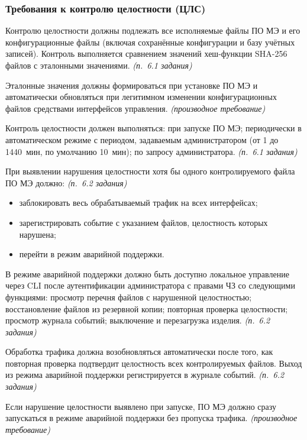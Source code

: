 \documentclass[12pt,a4paper,final]{article}
\newenvironment{reqs}
  {\begin{description}[style=sameline,leftmargin=2.2cm,labelwidth=2.0cm,
     labelsep=0.2cm,font=\normalfont\bfseries,itemsep=3pt]}
  {\end{description}}
\newcommand{\src}[1]{\textit{(п.~#1 задания)}}
\newcommand{\der}{\textit{(производное требование)}}
\begin{document}
\subsubsection{Требования к контролю целостности (ЦЛС)}

\begin{reqs}
\item[ЦЛС-01] Контролю целостности должны подлежать все исполняемые файлы
  ПО МЭ и его конфигурационные файлы (включая сохранённые конфигурации
  и базу учётных записей). Контроль выполняется сравнением значений хеш-функции
  SHA-256 файлов с эталонными значениями. \src{6.1}
\item[ЦЛС-02] Эталонные значения должны формироваться при установке ПО МЭ
  и автоматически обновляться при легитимном изменении конфигурационных файлов
  средствами интерфейсов управления. \der
\item[ЦЛС-03] Контроль целостности должен выполняться: при запуске ПО МЭ;
  периодически в автоматическом режиме с периодом, задаваемым администратором
  (от 1 до 1440~мин, по умолчанию 10~мин); по запросу администратора. \src{6.1}
\item[ЦЛС-04] При выявлении нарушения целостности хотя бы одного контролируемого
  файла ПО МЭ должно: \src{6.2}
  \begin{itemize}
  \item заблокировать весь обрабатываемый трафик на всех интерфейсах;
  \item зарегистрировать событие с указанием файлов, целостность которых нарушена;
  \item перейти в режим аварийной поддержки.
  \end{itemize}
\item[ЦЛС-05] В режиме аварийной поддержки должно быть доступно локальное
  управление через CLI после аутентификации администратора с правами ЧЗ
  со следующими функциями: просмотр перечня файлов с нарушенной целостностью;
  восстановление файлов из резервной копии; повторная проверка целостности;
  просмотр журнала событий; выключение и перезагрузка изделия. \src{6.2}
\item[ЦЛС-06] Обработка трафика должна возобновляться автоматически после того,
  как повторная проверка подтвердит целостность всех контролируемых файлов.
  Выход из режима аварийной поддержки регистрируется в журнале событий. \src{6.2}
\item[ЦЛС-07] Если нарушение целостности выявлено при запуске, ПО МЭ должно
  сразу запускаться в режиме аварийной поддержки без пропуска трафика. \der
\end{reqs}
\end{document}
